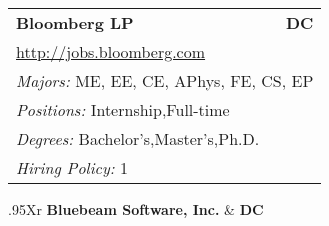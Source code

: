 \documentclass[twoside]{article}
\begin{document}
\begin{center}
\begin{multicols}{3}
\begin{FlushLeft}
\begin{minipage}{.9\columnwidth}
\end{minipage}
 
\begin{minipage}{.9\columnwidth}\begin{tabularx}{.95\columnwidth}{Xr}
                 {\Large\bf Bloomberg LP} & {\Large\bf DC}\\
    \multicolumn{2}{p{.95\columnwidth}}{\url{http://jobs.bloomberg.com}}\\
    \multicolumn{2}{p{.95\columnwidth}}{\emph{Majors:} ME, EE, CE, APhys, FE, CS, EP}\\
    \multicolumn{2}{p{.95\columnwidth}}{\emph{Positions:} Internship,Full-time}\\
    \multicolumn{2}{p{.95\columnwidth}}{\emph{Degrees:} Bachelor's,Master's,Ph.D.}\\
    \multicolumn{2}{p{.95\columnwidth}}{\emph{Hiring Policy:} 1}\\
    \end{tabularx}
    
\end{minipage}
 
\begin{minipage}{.9\columnwidth}\begin{tabularx}{.95\columnwidth}{Xr}
                 {\Large\bf Bluebeam Software, Inc.} & {\Large\bf DC}\\
    \\
    \\
    \\
    \\
    \\
    \end{tabularx}
    
\end{minipage}
 

\end{FlushLeft}
\end{multicols}
\end{center}
\end{document}
